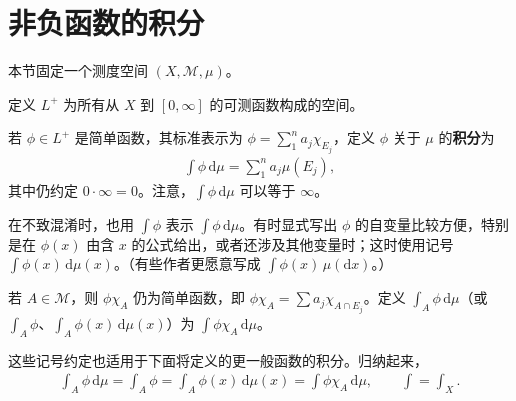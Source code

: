 \documentclass[../../main.tex]{subfiles}%
\begin{document}
\section{非负函数的积分}\label{section:ch02-nonnegative-integration}
本节固定一个测度空间 $(X,\mathscr{M},\mu)$。
\begin{definition}[非负可测函数空间]\label{definition:ch02-lplus}
定义 $L^+$ 为所有从 $X$ 到 $[0,\infty]$ 的可测函数构成的空间。
\end{definition}
\begin{definition}[非负简单函数的积分]\label{definition:ch02-simple-integral}
若 $\phi\in L^+$ 是简单函数，其标准表示为 $\phi=\sum_1^n a_j\chi_{E_j}$，定义 $\phi$ 关于 $\mu$ 的\textbf{积分}为
\begin{align*}
\int\phi\,\mathrm{d}\mu=\sum_1^n a_j\mu(E_j),
\end{align*}
其中仍约定 $0\cdot\infty=0$。注意，$\int\phi\,\mathrm{d}\mu$ 可以等于 $\infty$。
\end{definition}
\begin{remark}
在不致混淆时，也用 $\int\phi$ 表示 $\int\phi\,\mathrm{d}\mu$。有时显式写出 $\phi$ 的自变量比较方便，特别是在 $\phi(x)$ 由含 $x$ 的公式给出，或者还涉及其他变量时；这时使用记号 $\int\phi(x)\,\mathrm{d}\mu(x)$。（有些作者更愿意写成 $\int\phi(x)\,\mu(\mathrm{d}x)$。）
\end{remark}
\begin{definition}[集合上的积分]\label{definition:ch02-integral-on-set}
若 $A\in\mathscr{M}$，则 $\phi\chi_A$ 仍为简单函数，即 $\phi\chi_A=\sum a_j\chi_{A\cap E_j}$。定义 $\int_A\phi\,\mathrm{d}\mu$（或 $\int_A\phi$、$\int_A\phi(x)\,\mathrm{d}\mu(x)$）为 $\int\phi\chi_A\,\mathrm{d}\mu$。
\end{definition}
这些记号约定也适用于下面将定义的更一般函数的积分。归纳起来，
\begin{align*}
\int_A\phi\,\mathrm{d}\mu=\int_A\phi=\int_A\phi(x)\,\mathrm{d}\mu(x)=\int\phi\chi_A\,\mathrm{d}\mu,
\qquad\int=\int_X.
\end{align*}
\end{document}
